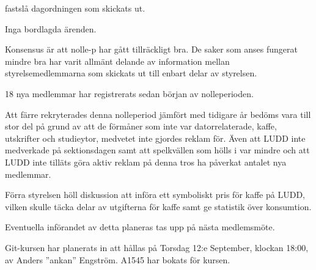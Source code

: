 \documentclass{protokoll}
\begin{document}
\newpage  


\begin{beslut}
     \att fastslå dagordningen som skickats ut.
\end{beslut}

Inga bordlagda ärenden.

Konsensus är att nolle-p har gått tillräckligt bra. De saker som anses fungerat
mindre bra har varit allmänt delande av information mellan styrelsemedlemmarna 
som skickats ut till enbart delar av styrelsen. 


18 nya medlemmar har registrerats sedan början av nolleperioden. 


Att färre rekryterades denna nolleperiod jämfört med tidigare år bedöms vara
till stor del på grund av att de förmåner som inte var datorrelaterade, kaffe,
utskrifter och studieytor, medvetet inte gjordes reklam för. 
Även att LUDD inte medverkade på sektionsdagen samt att spelkvällen som hölls 
i var mindre och att LUDD inte tilläts göra aktiv reklam på denna tros ha
påverkat antalet nya medlemmar. 



Förra styrelsen höll diskussion att införa ett symboliskt pris för kaffe på 
LUDD, vilken skulle täcka delar av utgifterna för kaffe samt ge statistik över
konsumtion.


Eventuella införandet av detta planeras tas upp på nästa medlemsmöte. 

Git-kursen har planerats in att hållas på Torsdag 12:e September, klockan 
18:00, av Anders ''ankan'' Engström. A1545 har bokats för kursen. 
\end{document}
